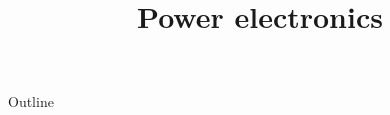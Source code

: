 \documentclass{../course_template/lectureClass}
\begin{document}
\title[Power electronics]{Power electronics}
\date{}
\begin{frame}[plain]
    \titlepage
\end{frame}

\begin{frame}{Outline}
    \tableofcontents
\end{frame}


\end{document}
